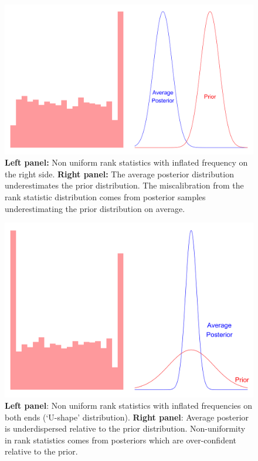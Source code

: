 \documentclass[12pt, a4paper]{article}
\begin{document}
            \begin{figure}[H]
                \centering
                \includegraphics[scale=0.07]{methodology/rhs.png}
                \caption{\textbf{Left panel:} Non uniform rank statistics with inflated frequency on the right side. \textbf{Right panel:} The average posterior distribution underestimates the prior distribution. The miscalibration from the rank statistic distribution comes from posterior samples underestimating the prior distribution on average.}
                \label{fig:underestimation}
            \end{figure}        

            \begin{figure}[H]
                \centering
                \includegraphics[scale=0.07]{methodology/underdispersed.png}
                \caption{\textbf{Left panel}: Non uniform rank statistics with inflated frequencies on both ends (`U-shape' distribution). \textbf{Right panel}: Average posterior is underdispersed relative to the prior distribution. Non-uniformity in rank statistics comes from posteriors which are over-confident relative to the prior.}
                \label{fig:underdispersed}
            \end{figure}
\end{document}
